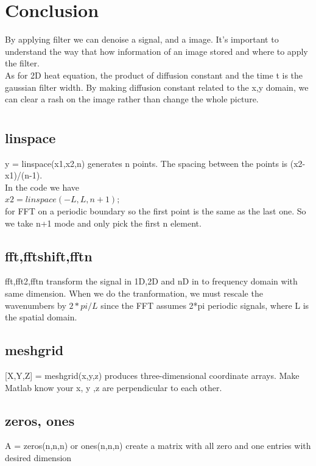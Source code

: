 \documentclass[12pt,letterpaper]{article}
\begin{document}
\section{Conclusion}
By applying filter we can denoise a signal, and a image. It's important to understand the way that how information of an image stored and where to apply the filter.\\
As for 2D heat equation, the product of diffusion constant and the time t is the gaussian filter width. By making diffusion constant related to the x,y domain, we can clear a rash on the image rather than change the whole picture.





\appendix
\section{}
\subsection{linspace}
y = linspace(x1,x2,n) generates n points. The spacing between the points is (x2-x1)/(n-1).\\
In the code we have \\
$x2=linspace(-L,L,n+1);$\\
for FFT on a periodic boundary so the first point is the same as the last one. So we take n+1 mode and only pick the first n element.

\subsection{fft,fftshift,fftn}
fft,fft2,fftn transform the signal in 1D,2D and nD in to frequency domain with same dimension. When we do the tranformation, we must rescale the wavenumbers by $2*pi/L$ since the FFT assumes 2*pi periodic signals, where L is the spatial domain.

\subsection{meshgrid}
[X,Y,Z] = meshgrid(x,y,z) produces three-dimensional coordinate arrays. Make Matlab know your x, y ,z are perpendicular to each other.

\subsection{zeros, ones}
A = zeros(n,n,n) or ones(n,n,n) create a matrix with all zero and one entries with desired dimension
\end{document}
